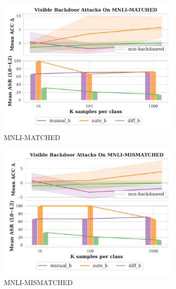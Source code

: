 \begin{figure}[!ht]
\begin{subfigure}{.33\textwidth}
  \includegraphics[width=\linewidth]{figures/evaluation_media/MNLI-MATCHED_score_n_attack.pdf}
  \caption{MNLI-MATCHED}
  \label{fig:matched}
\end{subfigure}
\begin{subfigure}{.33\textwidth}
  \centering
  \includegraphics[width=\linewidth]{figures/evaluation_media/MNLI-MISMATCHED_score_n_attack.pdf}
  \caption{MNLI-MISMATCHED}
  \label{fig:mismatched}
\end{subfigure}%
\begin{subfigure}{.33\textwidth}
  \centering

\end{subfigure}
\end{figure}

